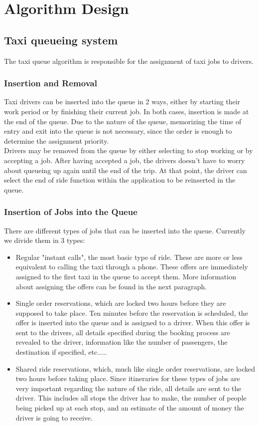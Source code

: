 \section{Algorithm Design}

\subsection{Taxi queueing system}
	The taxi queue algorithm is responsible for the assignment of taxi jobs to drivers. 
	\subsubsection{Insertion and Removal}
		Taxi drivers can be inserted into the queue in 2 ways, either by starting their work period or by finishing their current job. In both cases, insertion is made at the end of 
		the queue. Due to the nature of the queue, memorizing the time of entry and exit into the queue is not necessary, since the order is enough to determine the assignment
		priority. \\
		Drivers may be removed from the queue by either selecting to stop working or by accepting a job. After having accepted a job, the drivers doesn't have to worry about queueing
		up again until the end of the trip. At that point, the driver can select the end of ride function within the application to be reinserted in the queue.\\
	\subsubsection{Insertion of Jobs into the Queue}
		There are different types of jobs that can be inserted into the queue. Currently we divide them in 3 types:
		\begin{itemize}
		\item Regular "instant calls", the most basic type of ride. These are more or less equivalent to calling the taxi through a phone. These offers are immediately assigned to the
		first taxi in the queue to accept them. More information about assigning the offers can be found in the next paragraph.
		\item Single order reservations, which are locked two hours before they are supposed to take place. Ten minutes before the reservation is scheduled, the offer is inserted into the
		queue and is assigned to a driver. When this offer is sent to the drivers, all details specified during the booking process are revealed to the driver, information like the number
		of passengers, the destination if specified, etc.....
		\item Shared ride reservations, which, much like single order reservations, are locked two hours before taking place. Since itineraries for these types of jobs are very important 
		regarding the nature of the ride, all details are sent to the driver. This includes all stops the driver has to make, the number of people being picked up at each stop, and an estimate
		of the amount of money the driver is going to receive. 
		\end{itemize}
